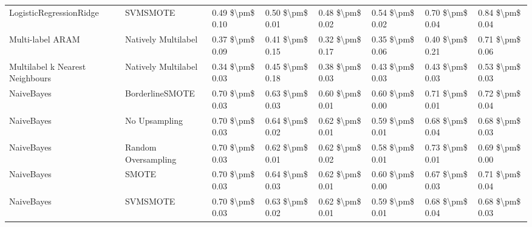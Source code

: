 \begin{tabular}{llllllll}
        LogisticRegressionRidge &                      SVMSMOTE &     0.49 \$\textbackslash pm\$ 0.10 &           0.50 \$\textbackslash pm\$ 0.01 &       0.48 \$\textbackslash pm\$ 0.02 &        0.54 \$\textbackslash pm\$ 0.02 &                         0.70 \$\textbackslash pm\$ 0.04 & 0.84 \$\textbackslash pm\$ 0.04 \\
               Multi-label ARAM &           Natively Multilabel &     0.37 \$\textbackslash pm\$ 0.09 &           0.41 \$\textbackslash pm\$ 0.15 &       0.32 \$\textbackslash pm\$ 0.17 &        0.35 \$\textbackslash pm\$ 0.06 &                         0.40 \$\textbackslash pm\$ 0.21 & 0.71 \$\textbackslash pm\$ 0.06 \\
Multilabel k Nearest Neighbours &           Natively Multilabel &     0.34 \$\textbackslash pm\$ 0.03 &           0.45 \$\textbackslash pm\$ 0.18 &       0.38 \$\textbackslash pm\$ 0.03 &        0.43 \$\textbackslash pm\$ 0.03 &                         0.43 \$\textbackslash pm\$ 0.03 & 0.53 \$\textbackslash pm\$ 0.03 \\
                     NaiveBayes &               BorderlineSMOTE &     0.70 \$\textbackslash pm\$ 0.03 &           0.63 \$\textbackslash pm\$ 0.03 &       0.60 \$\textbackslash pm\$ 0.01 &        0.60 \$\textbackslash pm\$ 0.00 &                         0.71 \$\textbackslash pm\$ 0.01 & 0.72 \$\textbackslash pm\$ 0.04 \\
                     NaiveBayes &                 No Upsampling &     0.70 \$\textbackslash pm\$ 0.03 &           0.64 \$\textbackslash pm\$ 0.02 &       0.62 \$\textbackslash pm\$ 0.01 &        0.59 \$\textbackslash pm\$ 0.01 &                         0.68 \$\textbackslash pm\$ 0.04 & 0.68 \$\textbackslash pm\$ 0.03 \\
                     NaiveBayes &           Random Oversampling &     0.70 \$\textbackslash pm\$ 0.03 &           0.62 \$\textbackslash pm\$ 0.01 &       0.62 \$\textbackslash pm\$ 0.02 &        0.58 \$\textbackslash pm\$ 0.01 &                         0.73 \$\textbackslash pm\$ 0.01 & 0.69 \$\textbackslash pm\$ 0.00 \\
                     NaiveBayes &                         SMOTE &     0.70 \$\textbackslash pm\$ 0.03 &           0.64 \$\textbackslash pm\$ 0.03 &       0.62 \$\textbackslash pm\$ 0.01 &        0.60 \$\textbackslash pm\$ 0.00 &                         0.67 \$\textbackslash pm\$ 0.03 & 0.71 \$\textbackslash pm\$ 0.04 \\
                     NaiveBayes &                      SVMSMOTE &     0.70 \$\textbackslash pm\$ 0.03 &           0.63 \$\textbackslash pm\$ 0.02 &       0.62 \$\textbackslash pm\$ 0.01 &        0.59 \$\textbackslash pm\$ 0.01 &                         0.68 \$\textbackslash pm\$ 0.04 & 0.68 \$\textbackslash pm\$ 0.03 \\

\end{tabular}
